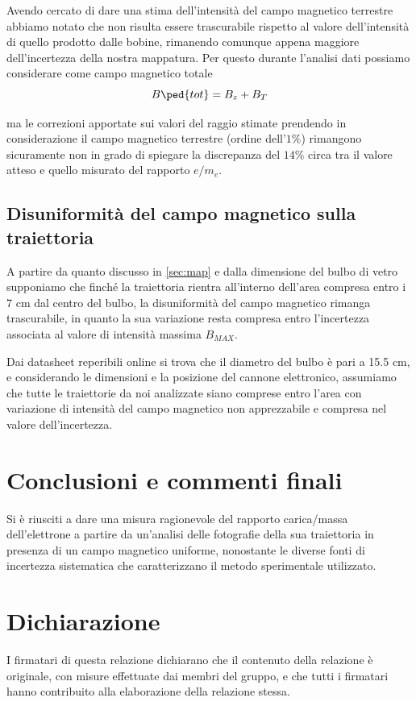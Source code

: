 \documentclass[10pt, a4paper, italian]{article}
\begin{document}
Avendo cercato di dare una stima dell'intensità del campo magnetico terrestre
abbiamo notato che non risulta essere trascurabile rispetto al valore
dell'intensità di quello prodotto dalle bobine, rimanendo comunque appena
maggiore dell'incertezza della nostra mappatura. Per questo durante l'analisi
dati possiamo considerare come campo magnetico totale
\[
B\ped{tot} = B_z + B_T
\]

ma le correzioni apportate sui valori del raggio stimate prendendo in
considerazione il campo magnetico terrestre (ordine dell'$1\%$) rimangono
sicuramente non in grado di spiegare la discrepanza del $14 \%$ circa tra il
valore atteso e quello misurato del rapporto $e/m_e$.
\subsection{Disuniformità del campo magnetico sulla traiettoria}
A partire da quanto discusso in \ref{sec:map} e dalla dimensione del bulbo
di vetro supponiamo che finché la traiettoria rientra all'interno dell'area
compresa entro i 7 cm dal centro del bulbo, la disuniformità del campo
magnetico rimanga trascurabile, in quanto la sua variazione resta compresa
entro l'incertezza associata al valore di intensità massima $B_{MAX}$.

Dai datasheet reperibili online si trova che il diametro del bulbo è pari a
15.5 cm, e considerando le dimensioni e la posizione del cannone elettronico,
assumiamo che tutte le traiettorie da noi analizzate siano comprese entro
l'area con variazione di intensità del campo magnetico non apprezzabile e
compresa nel valore dell'incertezza.

\section*{Conclusioni e commenti finali}
Si è riusciti a dare una misura ragionevole del rapporto carica/massa
dell'elettrone a partire da un'analisi delle fotografie della sua traiettoria
in presenza di un campo magnetico uniforme, nonostante le diverse fonti di
incertezza sistematica che caratterizzano il metodo sperimentale utilizzato.

\section*{Dichiarazione}
I firmatari di questa relazione dichiarano che il contenuto della relazione \`e
originale, con misure effettuate dai membri del gruppo, e che tutti i firmatari
hanno contribuito alla elaborazione della relazione stessa.

\begin{thebibliography}{1}
\end{thebibliography}
\end{document}
